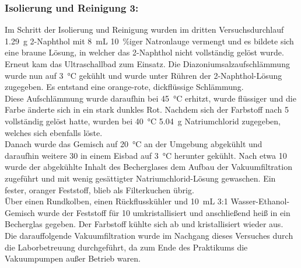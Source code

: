 \subsubsection*{Isolierung und Reinigung 3:}
Im Schritt der Isolierung und Reinigung wurden im dritten Versuchsdurchlauf \SI{1,29}{\gram} 2-Naphthol mit \SI{8}{\milli \liter} \SI{10}{\percent}iger Natronlauge vermengt und es bildete sich eine braune Lösung, in welcher das 2-Naphthol nicht vollständig gelöst wurde. Erneut kam das Ultraschallbad zum Einsatz. Die Diazoniumsalzaufschlämmung wurde nun auf \SI{3}{\celsius} gekühlt und wurde unter Rühren der 2-Naphthol-Lösung zugegeben. Es entstand eine orange-rote, dickflüssige Schlämmung.\\
Diese Aufschlämmung wurde daraufhin bei \SI{45}{\celsius} erhitzt, wurde flüssiger und die Farbe änderte sich in ein stark dunkles Rot. Nachdem sich der Farbstoff nach \SI{5}{\min } vollständig gelöst hatte, wurden bei \SI{40}{\celsius} \SI{5,04}{\gram} Natriumchlorid zugegeben, welches sich ebenfalls löste.\\ 
Danach wurde das Gemisch auf \SI{20}{\celsius} an der Umgebung abgekühlt und daraufhin weitere \SI{30}{\min} in einem Eisbad auf \SI{3}{\celsius} herunter gekühlt. Nach etwa \SI{10}{\min} wurde der abgekühlte Inhalt des Becherglases dem Aufbau der Vakuumfiltration zugeführt und mit wenig gesättigter Natriumchlorid-Lösung gewaschen. Ein fester, oranger Feststoff, blieb als Filterkuchen übrig.\\
Über einen Rundkolben, einen Rückflusskühler und \SI{10}{\milli \liter} 3:1 Wasser-Ethanol- Gemisch wurde der Feststoff für \SI{10}{\min} umkristallisiert und anschließend heiß in ein Becherglas gegeben. Der Farbstoff kühlte sich ab und kristallisiert wieder aus.\\
Die darauffolgende Vakuumfiltration wurde im Nachgang dieses Versuches durch die Laborbetreuung durchgeführt, da zum Ende des Praktikums die Vakuumpumpen außer Betrieb waren.
\newpage

